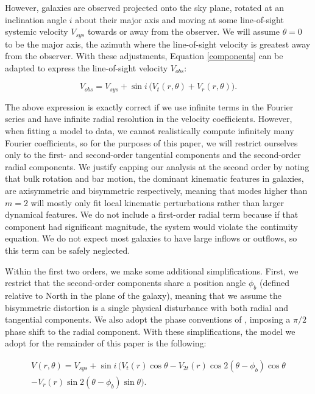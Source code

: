 However, galaxies are observed projected onto the sky plane, rotated at an inclination angle $i$ about their major axis and moving at some line-of-sight systemic velocity $V_{sys}$ towards or away from the observer. We will assume $\theta=0$ to be the major axis, the azimuth where the line-of-sight velocity is greatest away from the observer. With these adjustments, Equation \ref{components} can be adapted to express the line-of-sight velocity $V_{obs}$:

\begin{equation}
    V_{obs} = V_{sys} + \sin i \, \big(V_t(r,\theta) + V_r(r,\theta) \big).
\end{equation}

The above expression is exactly correct if we use infinite terms in the Fourier series and have infinite radial resolution in the velocity coefficients. However, when fitting a model to data, we cannot realistically compute infinitely many Fourier coefficients, so for the purposes of this paper, we will restrict ourselves only to the first- and second-order tangential components and the second-order radial components. We justify capping our analysis at the second order by noting that bulk rotation and bar motion, the dominant kinematic features in galaxies, are axisymmetric and bisymmetric respectively, meaning that modes higher than $m=2$ will mostly only fit local kinematic perturbations rather than larger dynamical features. We do not include a first-order radial term because if that component had significant magnitude, the system would violate the continuity equation. We do not expect most galaxies to have large inflows or outflows, so this term can be safely neglected.

Within the first two orders, we make some additional simplifications. First, we restrict that the second-order components share a position angle $\phi_b$ (defined relative to North in the plane of the galaxy), meaning that we assume the bisymmetric distortion is a single physical disturbance with both radial and tangential components. We also adopt the phase conventions of \cite{spekkens07}, imposing a $\pi/2$ phase shift to the radial component. With these simplifications, the model we adopt for the remainder of this paper is the following:

\begin{multline} \label{model}
    V(r, \theta) = V_{sys} + \sin i \, \bigg(V_t(r) \cos \theta - V_{2t}(r) \cos2 (\theta - \phi_b) \cos \theta \\ - V_r(r) \sin 2 (\theta - \phi_b) \sin \theta \bigg).
\end{multline}

